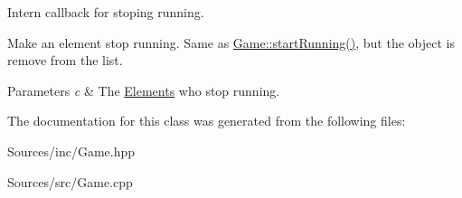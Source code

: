 Intern callback for stoping running. 

Make an element stop running. Same as \hyperlink{class_game_a27ad8f2a6f8f098cc28377df13c4ec2e}{Game\-::start\-Running()}, but the object is remove from the list. 
\begin{DoxyParams}{Parameters}
{\em c} & The \hyperlink{class_elements}{Elements} who stop running. \\
\hline
\end{DoxyParams}


The documentation for this class was generated from the following files\-:\begin{DoxyCompactItemize}
\item 
Sources/inc/Game.\-hpp\item 
Sources/src/Game.\-cpp\end{DoxyCompactItemize}
